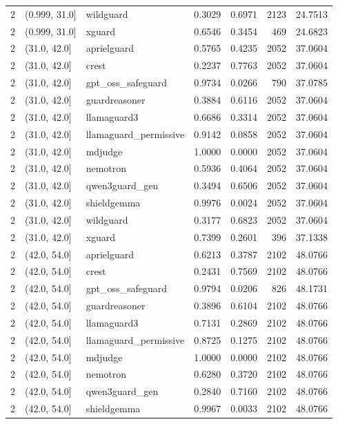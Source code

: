 \begin{tabular}{rllrrrr}
2 & (0.999, 31.0] & wildguard & 0.3029 & 0.6971 & 2123 & 24.7513 \\
2 & (0.999, 31.0] & xguard & 0.6546 & 0.3454 & 469 & 24.6823 \\
2 & (31.0, 42.0] & aprielguard & 0.5765 & 0.4235 & 2052 & 37.0604 \\
2 & (31.0, 42.0] & crest & 0.2237 & 0.7763 & 2052 & 37.0604 \\
2 & (31.0, 42.0] & gpt\_oss\_safeguard & 0.9734 & 0.0266 & 790 & 37.0785 \\
2 & (31.0, 42.0] & guardreasoner & 0.3884 & 0.6116 & 2052 & 37.0604 \\
2 & (31.0, 42.0] & llamaguard3 & 0.6686 & 0.3314 & 2052 & 37.0604 \\
2 & (31.0, 42.0] & llamaguard\_permissive & 0.9142 & 0.0858 & 2052 & 37.0604 \\
2 & (31.0, 42.0] & mdjudge & 1.0000 & 0.0000 & 2052 & 37.0604 \\
2 & (31.0, 42.0] & nemotron & 0.5936 & 0.4064 & 2052 & 37.0604 \\
2 & (31.0, 42.0] & qwen3guard\_gen & 0.3494 & 0.6506 & 2052 & 37.0604 \\
2 & (31.0, 42.0] & shieldgemma & 0.9976 & 0.0024 & 2052 & 37.0604 \\
2 & (31.0, 42.0] & wildguard & 0.3177 & 0.6823 & 2052 & 37.0604 \\
2 & (31.0, 42.0] & xguard & 0.7399 & 0.2601 & 396 & 37.1338 \\
2 & (42.0, 54.0] & aprielguard & 0.6213 & 0.3787 & 2102 & 48.0766 \\
2 & (42.0, 54.0] & crest & 0.2431 & 0.7569 & 2102 & 48.0766 \\
2 & (42.0, 54.0] & gpt\_oss\_safeguard & 0.9794 & 0.0206 & 826 & 48.1731 \\
2 & (42.0, 54.0] & guardreasoner & 0.3896 & 0.6104 & 2102 & 48.0766 \\
2 & (42.0, 54.0] & llamaguard3 & 0.7131 & 0.2869 & 2102 & 48.0766 \\
2 & (42.0, 54.0] & llamaguard\_permissive & 0.8725 & 0.1275 & 2102 & 48.0766 \\
2 & (42.0, 54.0] & mdjudge & 1.0000 & 0.0000 & 2102 & 48.0766 \\
2 & (42.0, 54.0] & nemotron & 0.6280 & 0.3720 & 2102 & 48.0766 \\
2 & (42.0, 54.0] & qwen3guard\_gen & 0.2840 & 0.7160 & 2102 & 48.0766 \\
2 & (42.0, 54.0] & shieldgemma & 0.9967 & 0.0033 & 2102 & 48.0766 \\

\end{tabular}
